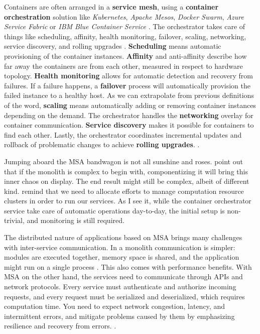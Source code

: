 \documentclass[utf8,english]{gradu3}
\begin{document}
Containers are often arranged in a \textbf{service mesh}, using a \textbf{container orchestration}
solution like \textit{Kubernetes}, \textit{Apache Mesos}, \textit{Docker Swarm},
\textit{Azure Service Fabric} or \textit{IBM Blue Container Service}
\parencite[18]{Gannon2017}. The orchestrator takes care of things like
scheduling, affinity, health monitoring, failover, scaling, networking, service
discovery, and rolling upgrades \parencite{Microsoft2022}. \textbf{Scheduling}
means automatic provisioning of the container instances. \textbf{Affinity} and
anti-affinity describe how far away the containers are from each other, measured
in respect to hardware topology. \textbf{Health monitoring} allows for automatic
detection and recovery from failures. If a failure happens, a \textbf{failover}
process will automatically provision the failed instance to a healthy host. As
we can extrapolate from previous definitions of the word, \textbf{scaling} means
automatically adding or removing container instances depending on the demand.
The orchestrator handles the \textbf{networking} overlay for container
communication. \textbf{Service discovery} makes it possible for containers to
find each other. Lastly, the orchestrator coordinates incremental updates and
rollback of problematic changes to achieve \textbf{rolling upgrades}.
\parencite{Microsoft2022}.

Jumping aboard the MSA bandwagon is not all sunshine and roses.
\textcite[18]{Li2021} point out that if the monolith is complex to begin with,
componentizing it will bring this inner chaos on display. The end result might
still be complex, albeit of different kind. \textcite[20]{Gannon2017} remind
that we need to allocate efforts to manage computation resource clusters in
order to run our services. As I see it, while the container orchestrator service
take care of automatic operations day-to-day, the initial setup is non-trivial,
and monitoring is still required.

The distributed nature of applications based on MSA brings many challenges with
inter-service communication. In a monolith communication is simpler: modules are
executed together, memory space is shared, and the application might run on a
single process \parencite{Microsoft2022}. This also comes with performance
benefits. With MSA on the other hand, the services need to communicate through
APIs and network protocols. Every service must authenticate and authorize
incoming requests, and every request must be serialized and deserialized, which
requires computation time. You need to expect network congestion, latency, and
intermittent errors, and mitigate problems caused by them by emphasizing
resilience and recovery from errors. \parencite{Microsoft2022}.
\end{document}
